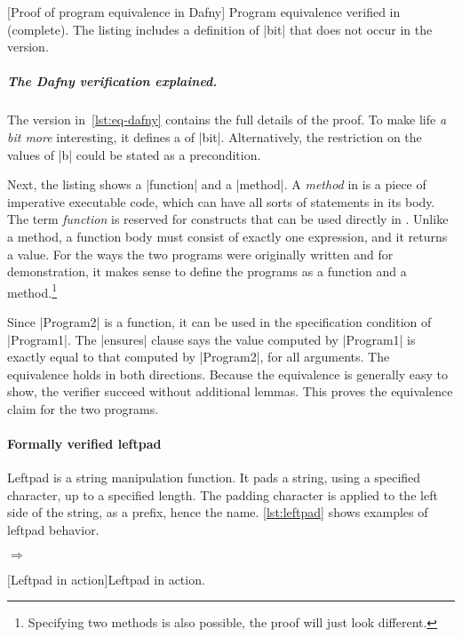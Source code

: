 \begin{center}
\begin{minipage}{\textwidth}
\captionsetup{type=lstlisting}
[Proof of program equivalence in Dafny]{
Program equivalence verified in  (complete). The listing includes a
 definition of \pr|bit| that does not occur in the 
version.}
\label{lst:eq-dafny}
\end{minipage}
\end{center}

\subparagraph*{The Dafny verification explained.}
The  version in~\autoref{lst:eq-dafny} contains the full details of
the proof. To make life \textit{a bit more} interesting, it defines a
 of \pr|bit|. Alternatively, the restriction on the values of
\pr|b| could be stated as a precondition.

Next, the listing shows a \pr|function| and a \pr|method|. A \emph{method} in
 is a piece of imperative executable code, which can have all sorts
of statements in its body. The term \emph{function} is reserved for constructs
that can be used directly in . Unlike a method, a function
body must consist of exactly one expression, and it returns a value. For the
ways the two programs were originally written and for demonstration, it makes
sense to define the programs as a function and a method.\footnote{Specifying
two methods is also possible, the proof will just look different.}

Since \pr|Program2| is a function, it can be used in the specification condition
of \pr|Program1|. The \pr|ensures| clause says the value computed by
\pr|Program1| is exactly equal to that computed by \pr|Program2|, for all
arguments. The equivalence holds in both directions. Because the equivalence is
generally easy to show, the verifier succeed without additional lemmas. This
proves the equivalence claim for the two programs.

\paragraph*{Formally verified leftpad}
Leftpad is a string manipulation function. It pads a string, using a specified
character, up to a specified length. The padding character is applied to the
left side of the string, as a prefix, hence the name. \autoref{lst:leftpad}
shows examples of leftpad behavior.

\begin{center}
\captionsetup{type=lstlisting}
\begin{minipage}{\textwidth}
\begin{minipage}{.45\textwidth}
\end{minipage}%
\hfill\(\Rightarrow\)\hfill%
\begin{minipage}{.45\textwidth}
\end{minipage}
\end{minipage}
[Leftpad in action]{Leftpad in action.}
\label{lst:leftpad}
\end{center}

